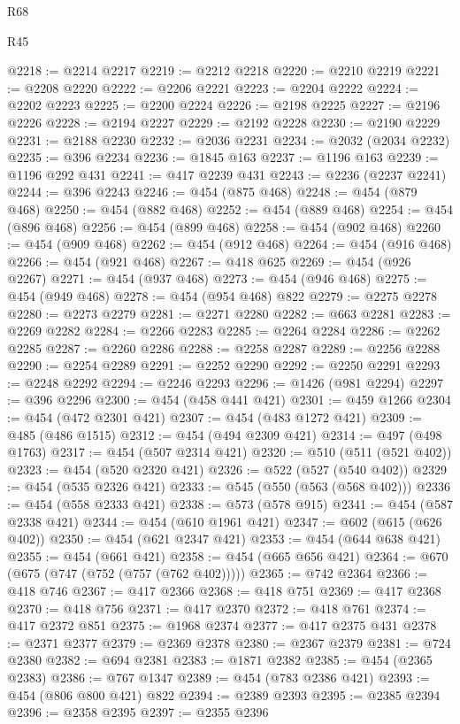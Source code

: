 \begin{lexlean}{R68}
\begin{lexlean}{R45}
\begin{coremodule}
{{{{{{{{{{{{{{{{{{{{{{{{{{{{{{{{{{{{{{{{{{{{{{{{{{{{{{{{{{{{{{{{{{{{{{{{{{{{{{{{{{{{{{{{{{{@2218 := @2214 @2217
@2219 := @2212 @2218
@2220 := @2210 @2219
@2221 := @2208 @2220
@2222 := @2206 @2221
@2223 := @2204 @2222
@2224 := @2202 @2223
@2225 := @2200 @2224
@2226 := @2198 @2225
@2227 := @2196 @2226
@2228 := @2194 @2227
@2229 := @2192 @2228
@2230 := @2190 @2229
@2231 := @2188 @2230
@2232 := @2036 @2231
@2234 := @2032 (@2034 @2232)
@2235 := @396 @2234
@2236 := @1845 @163
@2237 := @1196 @163
@2239 := @1196 @292 @431
@2241 := @417 @2239 @431
@2243 := @2236 (@2237 @2241)
@2244 := @396 @2243
@2246 := @454 (@875 @468)
@2248 := @454 (@879 @468)
@2250 := @454 (@882 @468)
@2252 := @454 (@889 @468)
@2254 := @454 (@896 @468)
@2256 := @454 (@899 @468)
@2258 := @454 (@902 @468)
@2260 := @454 (@909 @468)
@2262 := @454 (@912 @468)
@2264 := @454 (@916 @468)
@2266 := @454 (@921 @468)
@2267 := @418 @625
@2269 := @454 (@926 @2267)
@2271 := @454 (@937 @468)
@2273 := @454 (@946 @468)
@2275 := @454 (@949 @468)
@2278 := @454 (@954 @468) @822
@2279 := @2275 @2278
@2280 := @2273 @2279
@2281 := @2271 @2280
@2282 := @663 @2281
@2283 := @2269 @2282
@2284 := @2266 @2283
@2285 := @2264 @2284
@2286 := @2262 @2285
@2287 := @2260 @2286
@2288 := @2258 @2287
@2289 := @2256 @2288
@2290 := @2254 @2289
@2291 := @2252 @2290
@2292 := @2250 @2291
@2293 := @2248 @2292
@2294 := @2246 @2293
@2296 := @1426 (@981 @2294)
@2297 := @396 @2296
@2300 := @454 (@458 @441 @421)
@2301 := @459 @1266
@2304 := @454 (@472 @2301 @421)
@2307 := @454 (@483 @1272 @421)
@2309 := @485 (@486 @1515)
@2312 := @454 (@494 @2309 @421)
@2314 := @497 (@498 @1763)
@2317 := @454 (@507 @2314 @421)
@2320 := @510 (@511 (@521 @402))
@2323 := @454 (@520 @2320 @421)
@2326 := @522 (@527 (@540 @402))
@2329 := @454 (@535 @2326 @421)
@2333 := @545 (@550 (@563 (@568 @402)))
@2336 := @454 (@558 @2333 @421)
@2338 := @573 (@578 @915)
@2341 := @454 (@587 @2338 @421)
@2344 := @454 (@610 @1961 @421)
@2347 := @602 (@615 (@626 @402))
@2350 := @454 (@621 @2347 @421)
@2353 := @454 (@644 @638 @421)
@2355 := @454 (@661 @421)
@2358 := @454 (@665 @656 @421)
@2364 := @670 (@675 (@747 (@752 (@757 (@762 @402)))))
@2365 := @742 @2364
@2366 := @418 @746
@2367 := @417 @2366
@2368 := @418 @751
@2369 := @417 @2368
@2370 := @418 @756
@2371 := @417 @2370
@2372 := @418 @761
@2374 := @417 @2372 @851
@2375 := @1968 @2374
@2377 := @417 @2375 @431
@2378 := @2371 @2377
@2379 := @2369 @2378
@2380 := @2367 @2379
@2381 := @724 @2380
@2382 := @694 @2381
@2383 := @1871 @2382
@2385 := @454 (@2365 @2383)
@2386 := @767 @1347
@2389 := @454 (@783 @2386 @421)
@2393 := @454 (@806 @800 @421) @822
@2394 := @2389 @2393
@2395 := @2385 @2394
@2396 := @2358 @2395
@2397 := @2355 @2396
}}}}}}}}}}}}}}}}}}}}}}}}}}}}}}}}}}}}}}}}}}}}}}}}}}}}}}}}}}}}}}}}}}}}}}}}}}}}}}}}}}}}}}}}}}}
\end{coremodule}
\end{lexlean}
\end{lexlean}
